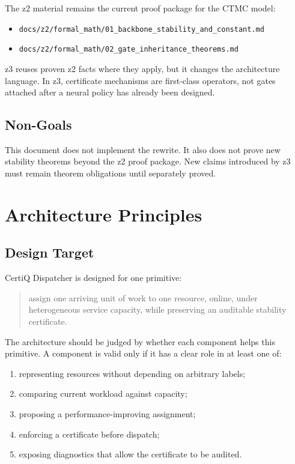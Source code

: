 \documentclass[a4paper,11pt]{article}
\theoremstyle{definition}
\begin{document}
The z2 material remains the current proof package for the CTMC model:
\begin{itemize}
  \item \texttt{docs/z2/formal\_math/01\_backbone\_stability\_and\_constant.md}
  \item \texttt{docs/z2/formal\_math/02\_gate\_inheritance\_theorems.md}
\end{itemize}
z3 reuses proven z2 facts where they apply, but it changes the architecture
language. In z3, certificate mechanisms are first-class operators, not gates
attached after a neural policy has already been designed.

\subsection*{Non-Goals}

This document does not implement the rewrite. It also does not prove new
stability theorems beyond the z2 proof package. New claims introduced by z3 must
remain theorem obligations until separately proved.

\section{Architecture Principles}

\subsection{Design Target}

CertiQ Dispatcher is designed for one primitive:
\begin{quote}
assign one arriving unit of work to one resource, online, under heterogeneous
service capacity, while preserving an auditable stability certificate.
\end{quote}

The architecture should be judged by whether each component helps this
primitive. A component is valid only if it has a clear role in at least one of:
\begin{enumerate}
  \item representing resources without depending on arbitrary labels;
  \item comparing current workload against capacity;
  \item proposing a performance-improving assignment;
  \item enforcing a certificate before dispatch;
  \item exposing diagnostics that allow the certificate to be audited.
\end{enumerate}
\end{document}
